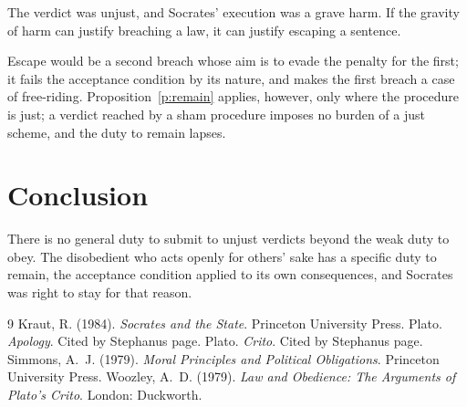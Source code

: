 \documentclass{situationist-preprint}
\begin{document}
\begin{objection}
The verdict was unjust, and Socrates' execution was a grave harm. If the gravity of harm can justify breaching a law, it can justify escaping a sentence.
\end{objection}

\begin{reply}
Escape would be a second breach whose aim is to evade the penalty for the first; it fails the acceptance condition by its nature, and makes the first breach a case of free-riding. Proposition~\ref{p:remain} applies, however, only where the procedure is just; a verdict reached by a sham procedure imposes no burden of a just scheme, and the duty to remain lapses.
\end{reply}

\section{Conclusion}

There is no general duty to submit to unjust verdicts beyond the weak duty to obey. The disobedient who acts openly for others' sake has a specific duty to remain, the acceptance condition applied to its own consequences, and Socrates was right to stay for that reason.

\begin{thebibliography}{9}\small
{} Kraut, R. (1984). \emph{Socrates and the State}. Princeton University Press.
 Plato. \emph{Apology}. Cited by Stephanus page.
 Plato. \emph{Crito}. Cited by Stephanus page.
 Simmons, A.~J. (1979). \emph{Moral Principles and Political Obligations}. Princeton University Press.
 Woozley, A.~D. (1979). \emph{Law and Obedience: The Arguments of Plato's Crito}. London: Duckworth.
\end{thebibliography}
\end{document}
